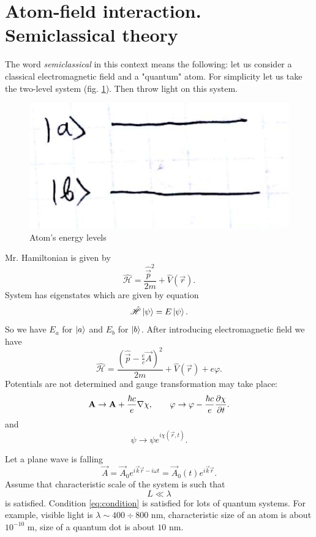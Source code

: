 \section{Atom-field interaction. Semiclassical theory}
\label{sec:atom-field_interaction}

The word \textit{semiclassical} in this context means the following: let us consider a classical electromagnetic field and a "quantum" atom. For simplicity let us take the two-level system (fig. \ref{fig:2lvl}). Then throw light on this system.
\begin{figure}[h!]
	\centering
	\includegraphics[width=0.35\linewidth]{fig/L4/2lvl}
	\caption{Atom's energy levels }
	\label{fig:2lvl}
\end{figure}

Mr. Hamiltonian is given by
\begin{equation}
	\hat{\mathscr{H}} = \frac{\hat{\vec{p}}^2}{2 m} + \hat{V} (\vec{r}).
\end{equation}
System has eigenstates which are given by equation
\begin{equation}
	\hat{\mathscr{H}} \left\lvert {\psi} \right\rangle = E \left\lvert {\psi} \right\rangle.
\end{equation}
So we have $E_a$ for $\left\lvert {a} \right\rangle$ and $E_b$ for $\left\lvert {b} \right\rangle$. After introducing electromagnetic field we have
\begin{equation}
	\hat{\mathscr{H}} = \frac{(\hat{\vec{p}} - \frac{e}{c} \vec{A})^2}{2m} + \hat{V}(\vec{r}) + e \varphi.
\end{equation}
Potentials are not determined and gauge transformation may take place:
\begin{equation}
	\mathbf{A} \to \mathbf{A} + \frac{\hbar c}{e} \nabla \chi, \qquad \varphi \to \varphi - \frac{\hbar c}{e} \dfrac{\partial {\chi}}{\partial {t}}.
\end{equation}
and
\begin{equation}
	\psi \to \psi e^{i \chi(\vec{r},t)}.
\end{equation}

Let a plane wave is falling 
\begin{equation}
	\vec{A} = \vec{A}_0 e^{i \vec{k}\vec{r} - i \omega t} = \vec{A}_0(t) e^{i \vec{k}\vec{r}}.
\end{equation}
Assume that characteristic scale of the system is such that 
\begin{equation}
	L \ll \lambda
	\label{eq:condition}
\end{equation}
is satisfied. Condition \eqref{eq:condition} is satisfied for lots of quantum systems. 
For example, visible light is $\lambda \sim 400 \div 800 \text{ nm}$, 
characteristic size of an atom is about $10^{-10} \text{ m}$, size of a quantum dot is about $10 \text{ nm}$. 

